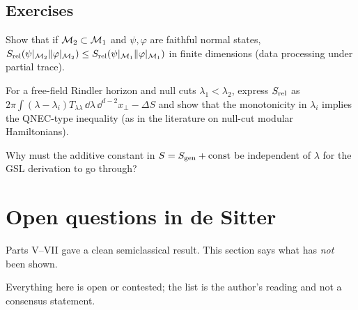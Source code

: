 \subsection*{Exercises}
\begin{exercise}\label{ex:gen_entropy:1}
Show that if $\mathcal{M}_2\subset\mathcal{M}_1$ and $\psi,\varphi$ are faithful normal states, $S_{\rm rel}(\psi|_{\mathcal{M}_2}\|\varphi|_{\mathcal{M}_2})\le S_{\rm rel}(\psi|_{\mathcal{M}_1}\|\varphi|_{\mathcal{M}_1})$ in finite dimensions (data processing under partial trace).
\end{exercise}
\begin{exercise}\label{ex:gen_entropy:2}
For a free-field Rindler horizon and null cuts $\lambda_1<\lambda_2$, express $S_{\rm rel}$ as $2\pi\int(\lambda-\lambda_i)T_{\lambda\lambda}\,\dd\lambda\,\dd^{d-2}x_\perp-\Delta S$ and show that the monotonicity in $\lambda_i$ implies the QNEC-type inequality (as in the literature on null-cut modular Hamiltonians).
\end{exercise}
\begin{exercise}\label{ex:gen_entropy:3}
Why must the additive constant in $S=S_{\mathrm{gen}}+\text{const}$ be independent of $\lambda$ for the GSL derivation to go through?
\end{exercise}

\section{Open questions in de Sitter}\label{ch:open_ds}

\begin{physmotiv}
Parts V--VII gave a clean semiclassical result. This section says what has \emph{not} been shown.
\end{physmotiv}

\begin{unsettled}
Everything here is open or contested; the list is the author's reading and not a consensus statement.
\end{unsettled}

